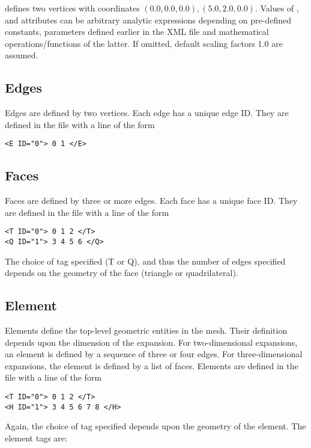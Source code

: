 defines two vertices with coordinates $(0.0,0.0,0.0), (5.0,2.0,0.0)$. Values of
,  and  attributes can be arbitrary
analytic expressions depending on pre-defined constants, parameters defined earlier in the XML file and
mathematical operations/functions of the latter. If omitted, default scaling
factors 1.0 are assumed.

\subsection{Edges}

Edges are defined by two vertices. Each edge has a unique edge ID. They are
defined in the file with a line of the form 

\begin{lstlisting}[style=XMLStyle]
<E ID="0"> 0 1 </E>
\end{lstlisting}

\subsection{Faces}

Faces are defined by three or more edges. Each face has a unique face ID. They
are defined in the file with a line of the form

\begin{lstlisting}[style=XMLStyle]
<T ID="0"> 0 1 2 </T>
<Q ID="1"> 3 4 5 6 </Q>
\end{lstlisting}

The choice of tag specified (T or Q), and thus the number of edges specified depends on the geometry of the face (triangle or quadrilateral).

\subsection{Element}

Elements define the top-level geometric entities in the mesh. Their definition depends upon the dimension of the expansion. For two-dimensional expansions, an element is defined by a sequence of three or four edges. For three-dimensional expansions, the element is defined by a list of faces. Elements are defined in the file with a line of the form
\begin{lstlisting}[style=XMLStyle]
<T ID="0"> 0 1 2 </T>
<H ID="1"> 3 4 5 6 7 8 </H>
\end{lstlisting}
Again, the choice of tag specified depends upon the geometry of the element. The element tags are:

